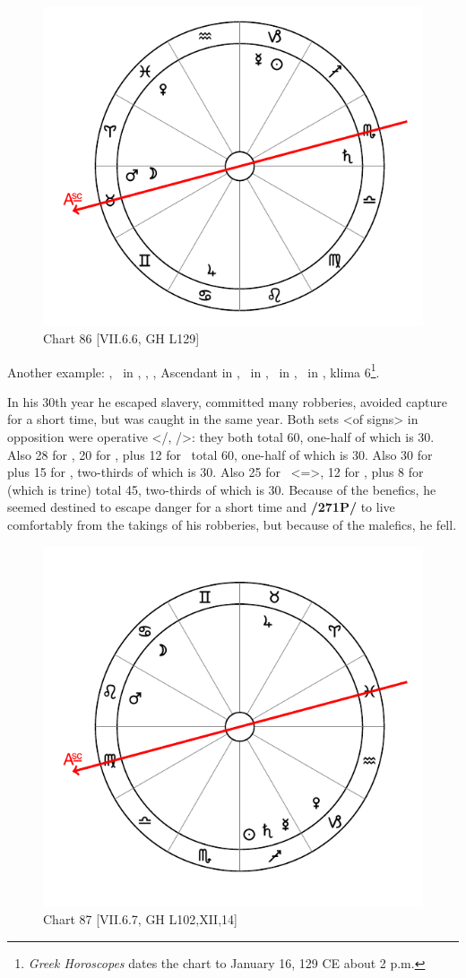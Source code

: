 \newpage
\begin{figure}
\centering
\vspace{0pt}
\includegraphics[width=.68\textwidth]{charts/7_6_06}
\caption{Chart 86 [VII.6.6, GH L129]}
\label{fig:chart86}
\end{figure} 

Another example: \Sun, \Mercury\, in \Capricorn, \Moon, \Mars, Ascendant in \Taurus, \Saturn\, in \Scorpio, \Jupiter\, in \Cancer, \Venus\, in \Pisces, klima 6\footnote{\textit{Greek Horoscopes} dates the chart to January 16, 129 CE about 2 p.m.}.

In his 30th year he escaped slavery, committed many robberies, avoided capture for a short time, but was caught in the same year. Both sets <of signs> in opposition were operative <\Taurus/\Scorpio, \Cancer/\Capricorn>: they both total 60, one-half of which is 30. Also 28 for \Capricorn, 20 for \Mercury, plus 12 for \Jupiter\, total 60, one-half of which is 30. Also 30 for \Saturn\, plus 15 for \Mars, two-thirds of which is 30. Also 25 for \Cancer\, <=\Moon>, 12 for \Jupiter, plus
8 for \Venus\, (which is trine) total 45, two-thirds of which is 30. Because of the benefics, he seemed destined to escape danger for a short time and \textbf{/271P/} to live comfortably from the takings of his robberies, but because of the malefics, he fell.

\newpage
\begin{figure}
\centering
\vspace{0pt}
\includegraphics[width=.68\textwidth]{charts/7_6_07}
\caption{Chart 87 [VII.6.7, GH L102,XII,14] }
\label{fig:chart87}
\end{figure} 

